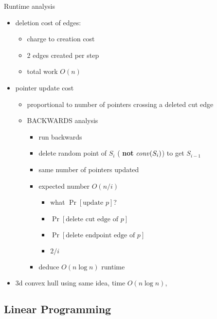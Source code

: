 \documentclass{article}
\begin{document}
Runtime analysis
\begin{itemize}
\item deletion cost of edges:
  \begin{itemize}
  \item charge to creation cost
  \item 2 edges created per step
  \item total work $O(n)$
  \end{itemize}
\item pointer update cost
  \begin{itemize}
  \item proportional to number of pointers crossing a deleted cut edge
  \item BACKWARDS analysis
    \begin{itemize}
    \item run backwards
    \item delete random point of $S_i$ (\textbf{ not} $\mathit{conv}(S_i)$) to get $S_{i-1}$
    \item same number of pointers updated
    \item  expected number $O(n/i)$
      \begin{itemize}
      \item what $\Pr[\mbox{update }  p]$?
      \item $\Pr[\mbox{delete cut edge of } p]$
      \item $\Pr[\mbox{delete endpoint  edge of } p]$
      \item $2/i$
      \end{itemize}
    \item deduce $O(n\log n)$ runtime
    \end{itemize}
  \end{itemize}
\item  3d convex hull using same idea, time $O(n\log n)$,
\end{itemize}

\subsection{Linear Programming}
\end{document}

